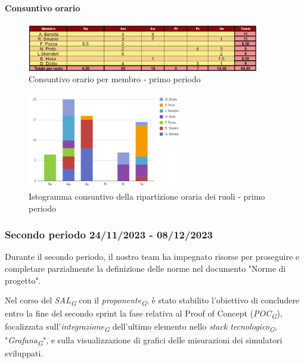 \paragraph*{Consuntivo orario} \hspace{1pt}

\begin{figure}[H]
    \centering
    \includegraphics[width=0.9\textwidth]{../Images/consuntivoOrario1Periodo.png}
    \caption{Consuntivo orario per membro - primo periodo}
    \label{fig:Constuntivo_orario_1}
\end{figure}

\begin{figure}[H]
    \centering
    \includegraphics[width=0.6\textwidth]{../Images/consuntivoDivisioneRuoli1Periodo.png}
    \caption{Istogramma consuntivo della ripartizione oraria dei ruoli - primo periodo}
    \label{fig:Consuntivo_ripartizione_oraria_1}
\end{figure}


\subsubsection{Secondo periodo  24/11/2023 - 08/12/2023}
Durante il secondo periodo, il nostro team ha impegnato risorse per proseguire e completare parzialmente la definizione delle norme nel documento "Norme di progetto".

Nel corso del \textit{SAL}\textsubscript{\textit{G}} con il \textit{proponente}\textsubscript{\textit{G}}, è stato stabilito l'obiettivo di concludere entro la fine del secondo sprint la fase relativa al Proof of Concept (\textit{POC}\textsubscript{\textit{G}}), focalizzata sull'\textit{integrazione}\textsubscript{\textit{G}} dell'ultimo elemento nello \textit{stack tecnologico}\textsubscript{\textit{G}}, "\textit{Grafana}\textsubscript{\textit{G}}", e sulla visualizzazione di grafici delle misurazioni dei simulatori sviluppati.

